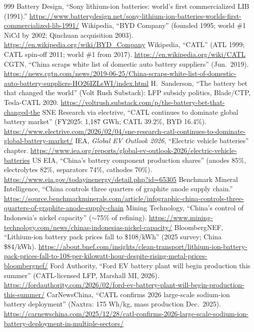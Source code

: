\begin{thebibliography}{999}
 Battery Design, ``Sony lithium-ion batteries: world's first commercialized LIB (1991).'' \url{https://www.batterydesign.net/sony-lithium-ion-batteries-worlds-first-commercialized-lib-1991/}
 Wikipedia, ``BYD Company'' (founded 1995; world \#1 NiCd by 2002; Qinchuan acquisition 2003). \url{https://en.wikipedia.org/wiki/BYD_Company}
 Wikipedia, ``CATL'' (ATL 1999; CATL spin-off 2011; world \#1 from 2017). \url{https://en.wikipedia.org/wiki/CATL}
 CGTN, ``China scraps white list of domestic auto battery suppliers'' (Jun.\ 2019). \url{https://news.cgtn.com/news/2019-06-25/China-scraps-white-list-of-domestic-auto-battery-suppliers-HO26IZLsWI/index.html}
 H.~Sanderson, ``The battery bet that changed the world'' (Volt Rush Substack): LFP subsidy politics, Blade/CTP, Tesla-CATL 2020. \url{https://voltrush.substack.com/p/the-battery-bet-that-changed-the}
 SNE Research via electrive, ``CATL continues to dominate global battery market'' (FY2025: 1,187 GWh; CATL 39.2\%, BYD 16.4\%). \url{https://www.electrive.com/2026/02/04/sne-research-catl-continues-to-dominate-global-battery-market/}
 IEA, \emph{Global EV Outlook 2026}, ``Electric vehicle batteries'' chapter. \url{https://www.iea.org/reports/global-ev-outlook-2026/electric-vehicle-batteries}
 US EIA, ``China's battery component production shares'' (anodes 85\%, electrolytes 82\%, separators 74\%, cathodes 70\%). \url{https://www.eia.gov/todayinenergy/detail.php?id=65305}
 Benchmark Mineral Intelligence, ``China controls three quarters of graphite anode supply chain.'' \url{https://source.benchmarkminerals.com/article/infographic-china-controls-three-quarters-of-graphite-anode-supply-chain}
 Mining Technology, ``China's control of Indonesia's nickel capacity'' ($\sim$75\% of refining). \url{https://www.mining-technology.com/news/chinas-indonesias-nickel-capacity/}
 BloombergNEF, ``Lithium-ion battery pack prices fall to \$108/kWh'' (2025 survey; China \$84/kWh). \url{https://about.bnef.com/insights/clean-transport/lithium-ion-battery-pack-prices-fall-to-108-per-kilowatt-hour-despite-rising-metal-prices-bloombergnef/}
 Ford Authority, ``Ford EV battery plant will begin production this summer'' (CATL-licensed LFP, Marshall MI, 2026). \url{https://fordauthority.com/2026/02/ford-ev-battery-plant-will-begin-production-this-summer/}
 CarNewsChina, ``CATL confirms 2026 large-scale sodium-ion battery deployment'' (Naxtra: 175 Wh/kg, mass production Dec.\ 2025). \url{https://carnewschina.com/2025/12/28/catl-confirms-2026-large-scale-sodium-ion-battery-deployment-in-multiple-sectors/}

\end{thebibliography}
